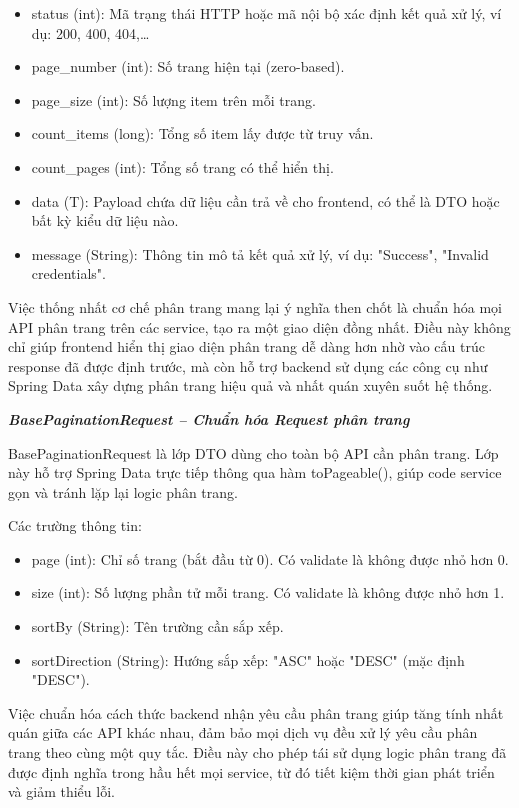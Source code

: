 \begin{itemize}
    \item status (int): Mã trạng thái HTTP hoặc mã nội bộ xác định kết quả xử lý, ví dụ: 200, 400, 404,\dots
    \item page\_number (int): Số trang hiện tại (zero-based).
    \item page\_size (int): Số lượng item trên mỗi trang.
    \item count\_items (long): Tổng số item lấy được từ truy vấn.
    \item count\_pages (int): Tổng số trang có thể hiển thị.
    \item data (T): Payload chứa dữ liệu cần trả về cho frontend, có thể là DTO hoặc bất kỳ kiểu dữ liệu nào.
    \item message (String): Thông tin mô tả kết quả xử lý, ví dụ: "Success", "Invalid credentials".
\end{itemize}

Việc thống nhất cơ chế phân trang mang lại ý nghĩa then chốt là chuẩn hóa mọi API phân trang trên các service, tạo ra một giao diện đồng nhất. Điều này không chỉ giúp frontend hiển thị giao diện phân trang dễ dàng hơn nhờ vào cấu trúc response đã được định trước, mà còn hỗ trợ backend sử dụng các công cụ như Spring Data xây dựng phân trang hiệu quả và nhất quán xuyên suốt hệ thống.

\textbf{\textit{BasePaginationRequest – Chuẩn hóa Request phân trang}}

BasePaginationRequest là lớp DTO dùng cho toàn bộ API cần phân trang. Lớp này hỗ trợ Spring Data trực tiếp thông qua hàm toPageable(), giúp code service gọn và tránh lặp lại logic phân trang.

Các trường thông tin:
\begin{itemize}
    \item page (int): Chỉ số trang (bắt đầu từ 0). Có validate là không được nhỏ hơn 0.
    \item size (int): Số lượng phần tử mỗi trang. Có validate là không được nhỏ hơn 1.
    \item sortBy (String): Tên trường cần sắp xếp.
    \item sortDirection (String): Hướng sắp xếp: "ASC" hoặc "DESC" (mặc định "DESC").
\end{itemize}

Việc chuẩn hóa cách thức backend nhận yêu cầu phân trang giúp tăng tính nhất quán giữa các API khác nhau, đảm bảo mọi dịch vụ đều xử lý yêu cầu phân trang theo cùng một quy tắc. Điều này cho phép tái sử dụng logic phân trang đã được định nghĩa trong hầu hết mọi service, từ đó tiết kiệm thời gian phát triển và giảm thiểu lỗi.

